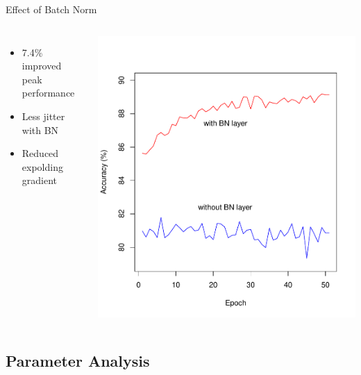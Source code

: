 \documentclass[aspectratio=1610, 12pt]{beamer}
\begin{document}
\begin{frame}{Effect of Batch Norm}
	\begin{columns}
		\begin{itemize}
			\item 7.4\% improved peak performance
			\item Less jitter with BN
			\item Reduced expolding gradient
		\end{itemize}

		\centering
		\includegraphics[scale=0.45]{images/batchnorm_measurement.pdf}
	\end{columns}
\end{frame}


\subsection{Parameter Analysis}
\end{document}
